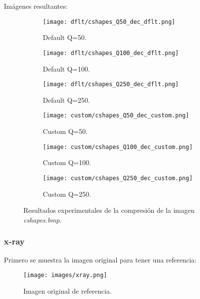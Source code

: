 \documentclass[12pt,a4paper]{article}
\begin{document}
Imágenes resultantes:
\begin{figure}[H]
    
    \begin{subfigure}{0.30\textwidth}
        \centering
        \texttt{[image: dflt/cshapes\_Q50\_dec\_dflt.png]}
        \caption{Default Q=50.}
        
    \end{subfigure}
    \hfill
    \begin{subfigure}{0.30\textwidth}
        \centering
        \texttt{[image: dflt/cshapes\_Q100\_dec\_dflt.png]}
        \caption{Default Q=100.}
        
    \end{subfigure}
    \hfill
    \begin{subfigure}{0.30\textwidth}
        \centering
        \texttt{[image: dflt/cshapes\_Q250\_dec\_dflt.png]}
        \caption{Default Q=250.}
        
    \end{subfigure}
    
    \vspace{0.5cm}
    
    \begin{subfigure}{0.30\textwidth}
        \centering
        \texttt{[image: custom/cshapes\_Q50\_dec\_custom.png]}
        \caption{Custom Q=50.}
        
    \end{subfigure}
    \hfill
    \begin{subfigure}{0.30\textwidth}
        \centering
        \texttt{[image: custom/cshapes\_Q100\_dec\_custom.png]}
        \caption{Custom Q=100.}
        
    \end{subfigure}
    \hfill
    \begin{subfigure}{0.30\textwidth}
        \centering
        \texttt{[image: custom/cshapes\_Q250\_dec\_custom.png]}
        \caption{Custom Q=250.}
        
    \end{subfigure}
    
    \caption[Resultados experimentales - color\_shapes]{Resultados experimentales de la compresión de la imagen \textit{cshapes.bmp}.}
    
\end{figure}


\subsubsection{x-ray}
Primero se muestra la imagen original para tener una referencia:
\begin{figure}[H]
    \centering
    \texttt{[image: images/xray.png]}
    \caption[Referencia - x-ray]{Imagen original de referencia.}
    
\end{figure}
    
\end{document}
